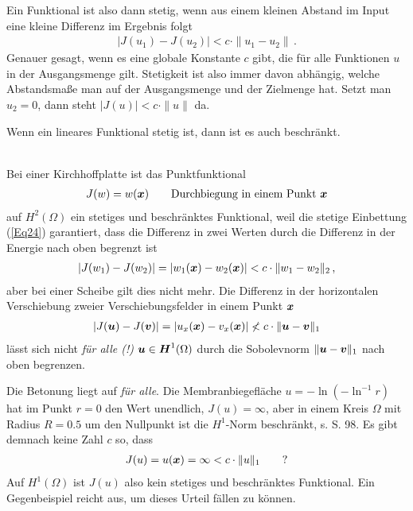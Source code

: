 Ein Funktional ist also dann stetig, wenn aus einem kleinen Abstand im Input eine kleine Differenz im Ergebnis folgt
\begin{align}
|J(u_1) - J(u_2) | < c \cdot \|u_1 - u_2\|\,.
\end{align}
Genauer gesagt, wenn es eine globale Konstante $c$ gibt, die f\"{u}r alle Funktionen $u$ in der Ausgangsmenge gilt. Stetigkeit ist also immer davon abh\"{a}ngig, welche Abstandsma{\ss}e man auf der Ausgangsmenge und der Zielmenge hat. Setzt man $u_2 = 0$, dann steht $|J(u)| < c \cdot \|u\|$ da. \\

\hspace*{-12pt}\colorbox{highlightBlue}{\parbox{0.98\textwidth}{Wenn ein lineares Funktional stetig ist, dann ist es auch beschr\"{a}nkt.}}\\

Bei einer Kirchhoffplatte ist das Punktfunktional
\begin{align}
J(w) = w(\mbox{\boldmath $x$}) \qquad \text{Durchbiegung in einem Punkt $\mbox{\boldmath $x$}$}
\end{align}
auf $H^2(\Omega)$ ein stetiges und beschr\"{a}nktes Funktional, weil die stetige Einbettung (\ref{Eq24}) garantiert, dass die Differenz in zwei Werten durch die Differenz in der Energie nach oben begrenzt ist
\begin{align}
|J(w_1) - J(w_2)| = |w_1(\mbox{\boldmath $x$}) - w_2(\mbox{\boldmath $x$})| < c \cdot \|w_1 - w_2\|_2\,,
\end{align}
aber bei einer Scheibe gilt dies nicht mehr. Die Differenz in der horizontalen Verschiebung zweier Verschiebungsfelder in einem Punkt $\mbox{\boldmath $x$}$
\begin{align}
|J(\mbox{\boldmath $u$}) - J(\mbox{\boldmath $v$})| = |u_{x}(\mbox{\boldmath $x$}) - v_{x}(\mbox{\boldmath $x$})|  \nless  c \cdot \|\mbox{\boldmath $u$} - \mbox{\boldmath $v$}\|_1
\end{align}
l\"{a}sst sich nicht {\em f\"{u}r alle (!)\/} $\mbox{\boldmath $u$} \in \mbox{\boldmath $H$}^1(\Omega)$ durch die Sobolevnorm $\|\mbox{\boldmath $u$} - \mbox{\boldmath $v$}\|_1$ nach oben begrenzen.

Die Betonung liegt auf {\em f\"{u}r alle\/}. Die Membranbiegefl\"{a}che $u = - \ln (- \ln^{-1} r)$ hat im Punkt $r = 0$ den Wert unendlich, $J(u) = \infty$, aber in einem Kreis $\Omega$ mit Radius $R = 0.5$ um den Nullpunkt ist die $H^1$-Norm beschr\"{a}nkt, s. \cite{Ha6} S. 98. Es gibt demnach keine Zahl $c $ so, dass
\begin{align}
J(u) = u(\mbox{\boldmath $x$}) = \infty < c \cdot \|u\|_1 \qquad\text{?}
\end{align}
Auf $H^1(\Omega)$ ist $J(u)$ also kein stetiges und beschr\"{a}nktes Funktional. Ein Gegenbeispiel reicht aus, um dieses Urteil f\"{a}llen zu k\"{o}nnen.


